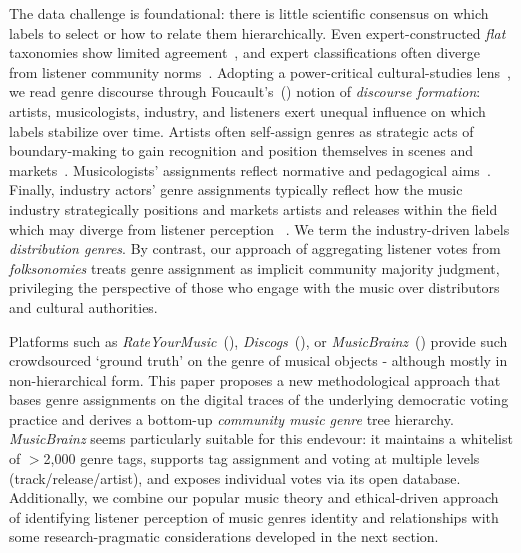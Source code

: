 \documentclass{article}
\begin{document}
The data challenge is foundational: there is little scientific consensus on which labels to select or how to relate them hierarchically. Even expert-constructed \textit{flat} taxonomies show limited agreement~\citep{pachetTaxonomyMusicalGenres2000}, and expert classifications often diverge from listener community norms~\citep{sordoQuestMusicalGenres2008}. Adopting a power-critical cultural-studies lens~\citep{dugayDoingCulturalStudies2013}, we read genre discourse through Foucault's~(\citeyear{foucaultArchaeologyKnowledge2013}) notion of \textit{discourse formation}: artists, musicologists, industry, and listeners exert unequal influence on which labels stabilize over time\citep{lenaClassificationCultureTypes2008}. Artists often self-assign genres as strategic acts of boundary-making to gain recognition and position themselves in scenes and markets~\citep{negusMusicGenresCorporate1999}. Musicologists' assignments reflect normative and pedagogical aims~\citep{bourdieuMarketSymbolicGoods1985}. Finally, industry actors' genre assignments typically reflect how the music industry strategically positions and markets artists and releases within the field which may diverge from listener perception ~\citep{valverdeInequityDesignMusic2025}. We term the industry-driven labels \textit{distribution genres}. By contrast, our approach of aggregating listener votes from \textit{folksonomies} treats genre assignment as implicit community majority judgment, privileging the perspective of those who engage with the music over distributors and cultural authorities. 


Platforms such as \mbox{\textit{RateYourMusic}}~(\citeyear{RateYourMusic_nodate}), \mbox{\textit{Discogs}}~(\citeyear{Discogs2024}), or \mbox{\textit{MusicBrainz}}~(\citeyear{MusicBrainz_nodate}) provide such crowdsourced `ground truth' on the genre of musical objects - although mostly in non-hierarchical form. This paper proposes a new methodological approach that bases genre assignments on the digital traces of the underlying democratic voting practice and derives a bottom-up \textit{community music genre} tree hierarchy. \textit{MusicBrainz} seems particularly suitable for this endevour: it maintains a whitelist of $>$2,000 genre tags, supports tag assignment and voting at multiple levels (track/release/artist), and exposes individual votes via its open database. Additionally, we combine our popular music theory and ethical-driven approach of identifying listener perception of music genres identity and relationships with some research-pragmatic considerations developed in the next section. 
\end{document}
